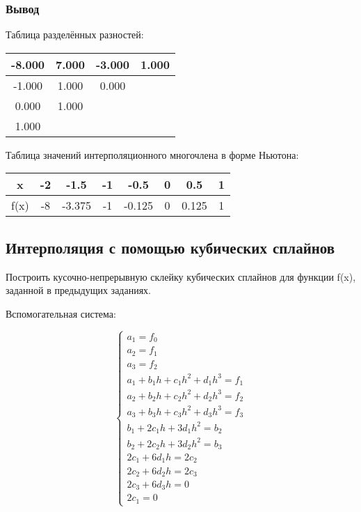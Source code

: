 \documentclass[bachelor, och, pract]{SCWorks}
\begin{document}
\subsubsection{Вывод}

Таблица разделённых разностей:

\begin{table}[h]
    \centering
    \begin{tabular}{|c|c|c|c|}
\hline-8.000  &    7.000  &   -3.000  &    1.000\\\hline
    -1.000  &    1.000   &   0.000   & \\\hline
     0.000  &    1.000 & & \\\hline
     1.000 & & & \\\hline
    \end{tabular}
\end{table}

Таблица значений интерполяционного многочлена в форме Ньютона:

\begin{table}[H]
    \centering
    \begin{tabular}{|c|c|c|c|c|c|c|c|}
         \hline x & -2 & -1.5 & -1 & -0.5 & 0 & 0.5 & 1\\\hline
          f(x) &  -8 & -3.375 & -1 & -0.125 & 0 & 0.125 & 1 \\\hline
    \end{tabular}
\end{table}



\subsection{Интерполяция с помощью кубических сплайнов}

Построить кусочно-непрерывную склейку кубических сплайнов для
функции f(x), заданной в предыдущих заданиях.

Вспомогательная система:

$$ 
\begin{cases}
a_1 = f_0 \\
a_2 = f_1 \\
a_3 = f_2 \\
a_1 + b_1h + c_1h^2 + d_1h^3 = f_1 \\
a_2 + b_2h + c_2h^2 + d_2h^3 = f_2 \\
a_3 + b_3h + c_3h^2 + d_3h^3 = f_3 \\
b_1 + 2c_1h + 3d_1h^2 = b_2 \\
b_2 + 2c_2h + 3d_2h^2 = b_3 \\
2c_1 + 6d_1h = 2c_2 \\
2c_2 + 6d_2h = 2c_3 \\
2c_3 + 6d_3h = 0 \\
2c_1 = 0
\end{cases} $$
\end{document}
